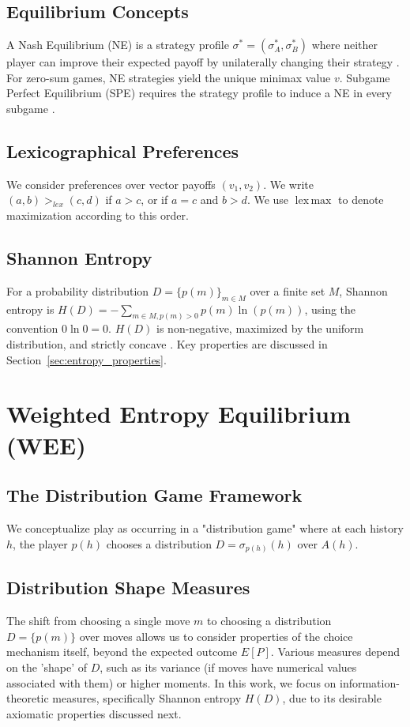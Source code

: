 \documentclass{article}
\DeclareMathOperator*{\lexmax}{lex\,max}
\begin{document}
\subsection{Equilibrium Concepts}
A Nash Equilibrium (NE) is a strategy profile $\sigma^* = (\sigma_A^*, \sigma_B^*)$ where neither player can improve their expected payoff by unilaterally changing their strategy \cite{placeholder_nash}. For zero-sum games, NE strategies yield the unique minimax value $v$. Subgame Perfect Equilibrium (SPE) requires the strategy profile to induce a NE in every subgame \cite{placeholder_selten_spe}.

\subsection{Lexicographical Preferences}
We consider preferences over vector payoffs $(v_1, v_2)$. We write $(a, b) >_{lex} (c, d)$ if $a > c$, or if $a = c$ and $b > d$. We use $\lexmax$ to denote maximization according to this order.

\subsection{Shannon Entropy}
For a probability distribution $D = \{p(m)\}_{m \in M}$ over a finite set $M$, Shannon entropy is $H(D) = - \sum_{m \in M, p(m)>0} p(m) \ln(p(m))$, using the convention $0 \ln 0 = 0$. $H(D)$ is non-negative, maximized by the uniform distribution, and strictly concave \cite{placeholder_cover_thomas}. Key properties are discussed in Section~\ref{sec:entropy_properties}.

\section{Weighted Entropy Equilibrium (WEE)}

\subsection{The Distribution Game Framework}
We conceptualize play as occurring in a "distribution game" where at each history $h$, the player $p(h)$ chooses a distribution $D = \sigma_{p(h)}(h)$ over $A(h)$.

\subsection{Distribution Shape Measures}
The shift from choosing a single move $m$ to choosing a distribution $D = \{p(m)\}$ over moves allows us to consider properties of the choice mechanism itself, beyond the expected outcome $E[P]$. Various measures depend on the 'shape' of $D$, such as its variance (if moves have numerical values associated with them) or higher moments. In this work, we focus on information-theoretic measures, specifically Shannon entropy $H(D)$, due to its desirable axiomatic properties discussed next.
\end{document}
